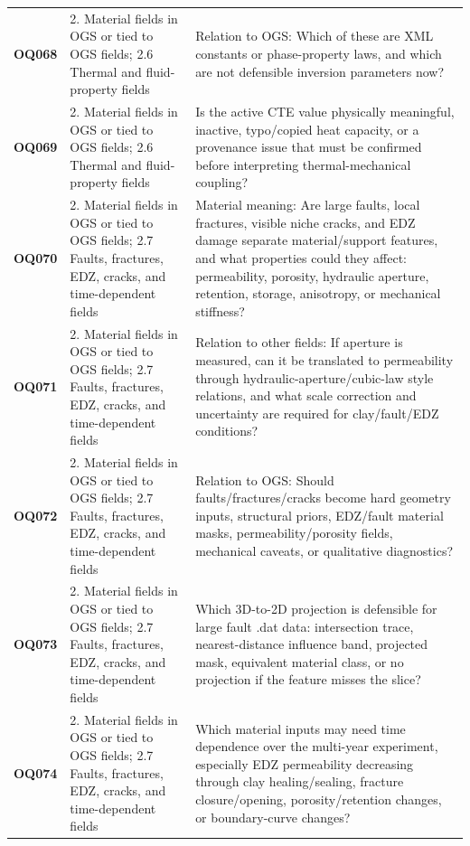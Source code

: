\begin{longtable}{@{}L{0.10\textwidth} L{0.23\textwidth} L{0.59\textwidth}@{}}
\addlinespace[0.16em]
\textbf{OQ068} & 2. Material fields in OGS or tied to OGS fields; 2.6 Thermal and fluid-property fields & Relation to OGS: Which of these are XML constants or phase-property laws, and which are not defensible inversion parameters now?\\
\addlinespace[0.16em]
\textbf{OQ069} & 2. Material fields in OGS or tied to OGS fields; 2.6 Thermal and fluid-property fields & Is the active CTE value physically meaningful, inactive, typo/copied heat capacity, or a provenance issue that must be confirmed before interpreting thermal-mechanical coupling?\\
\addlinespace[0.16em]
\textbf{OQ070} & 2. Material fields in OGS or tied to OGS fields; 2.7 Faults, fractures, EDZ, cracks, and time-dependent fields & Material meaning: Are large faults, local fractures, visible niche cracks, and EDZ damage separate material/support features, and what properties could they affect: permeability, porosity, hydraulic aperture, retention, storage, anisotropy, or mechanical stiffness?\\
\addlinespace[0.16em]
\textbf{OQ071} & 2. Material fields in OGS or tied to OGS fields; 2.7 Faults, fractures, EDZ, cracks, and time-dependent fields & Relation to other fields: If aperture is measured, can it be translated to permeability through hydraulic-aperture/cubic-law style relations, and what scale correction and uncertainty are required for clay/fault/EDZ conditions?\\
\addlinespace[0.16em]
\textbf{OQ072} & 2. Material fields in OGS or tied to OGS fields; 2.7 Faults, fractures, EDZ, cracks, and time-dependent fields & Relation to OGS: Should faults/fractures/cracks become hard geometry inputs, structural priors, EDZ/fault material masks, permeability/porosity fields, mechanical caveats, or qualitative diagnostics?\\
\addlinespace[0.16em]
\textbf{OQ073} & 2. Material fields in OGS or tied to OGS fields; 2.7 Faults, fractures, EDZ, cracks, and time-dependent fields & Which 3D-to-2D projection is defensible for large fault .dat data: intersection trace, nearest-distance influence band, projected mask, equivalent material class, or no projection if the feature misses the slice?\\
\addlinespace[0.16em]
\textbf{OQ074} & 2. Material fields in OGS or tied to OGS fields; 2.7 Faults, fractures, EDZ, cracks, and time-dependent fields & Which material inputs may need time dependence over the multi-year experiment, especially EDZ permeability decreasing through clay healing/sealing, fracture closure/opening, porosity/retention changes, or boundary-curve changes?\\

\end{longtable}
